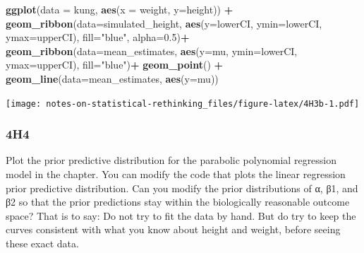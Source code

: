 \documentclass[
]{book}
\newenvironment{Shaded}{\begin{snugshade}}{\end{snugshade}}
\newcommand{\DataTypeTok}[1]{\textcolor[rgb]{0.13,0.29,0.53}{#1}}
\newcommand{\FloatTok}[1]{\textcolor[rgb]{0.00,0.00,0.81}{#1}}
\newcommand{\KeywordTok}[1]{\textcolor[rgb]{0.13,0.29,0.53}{\textbf{#1}}}
\newcommand{\NormalTok}[1]{#1}
\newcommand{\OperatorTok}[1]{\textcolor[rgb]{0.81,0.36,0.00}{\textbf{#1}}}
\newcommand{\StringTok}[1]{\textcolor[rgb]{0.31,0.60,0.02}{#1}}
\begin{document}
\begin{Shaded}
\begin{Highlighting}[]
\KeywordTok{ggplot}\NormalTok{(}\DataTypeTok{data =}\NormalTok{ kung, }\KeywordTok{aes}\NormalTok{(}\DataTypeTok{x =}\NormalTok{ weight, }\DataTypeTok{y=}\NormalTok{height)) }\OperatorTok{+}\StringTok{ }
\StringTok{  }\KeywordTok{geom\_ribbon}\NormalTok{(}\DataTypeTok{data=}\NormalTok{simulated\_height, }\KeywordTok{aes}\NormalTok{(}\DataTypeTok{y=}\NormalTok{lowerCI, }\DataTypeTok{ymin=}\NormalTok{lowerCI, }\DataTypeTok{ymax=}\NormalTok{upperCI), }\DataTypeTok{fill=}\StringTok{"blue"}\NormalTok{, }\DataTypeTok{alpha=}\FloatTok{0.5}\NormalTok{)}\OperatorTok{+}
\StringTok{  }\KeywordTok{geom\_ribbon}\NormalTok{(}\DataTypeTok{data=}\NormalTok{mean\_estimates, }\KeywordTok{aes}\NormalTok{(}\DataTypeTok{y=}\NormalTok{mu, }\DataTypeTok{ymin=}\NormalTok{lowerCI, }\DataTypeTok{ymax=}\NormalTok{upperCI), }\DataTypeTok{fill=}\StringTok{"blue"}\NormalTok{)}\OperatorTok{+}
\StringTok{  }\KeywordTok{geom\_point}\NormalTok{() }\OperatorTok{+}\StringTok{ }
\StringTok{  }\KeywordTok{geom\_line}\NormalTok{(}\DataTypeTok{data=}\NormalTok{mean\_estimates, }\KeywordTok{aes}\NormalTok{(}\DataTypeTok{y=}\NormalTok{mu))}
\end{Highlighting}
\end{Shaded}

\texttt{[image: notes-on-statistical-rethinking\_files/figure-latex/4H3b-1.pdf]}

\hypertarget{h4-2}{%
\subsubsection*{4H4}\label{h4-2}}

Plot the prior predictive distribution for the parabolic polynomial regression model in the chapter. You can modify the code that plots the linear regression prior predictive distribution. Can you modify the prior distributions of α, β1, and β2 so that the prior predictions stay within the biologically reasonable outcome space? That is to say: Do not try to fit the data by hand. But do try to keep the curves consistent with what you know about height and weight, before seeing these exact data.
\end{document}
